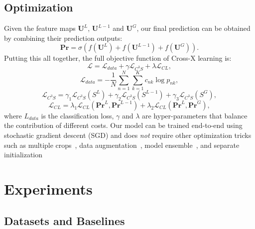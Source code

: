 \documentclass[10pt,twocolumn,letterpaper]{article}
\begin{document}
\subsection{Optimization}
\label{sec:fpe}
Given the feature maps $\mathbf{U}^L$, $\mathbf{U}^{L-1}$ and $\mathbf{U}^G$, our final prediction can be obtained by combining their prediction outputs:
\begin{equation}
\label{eq:softmax}
\mathbf{Pr} = \sigma\left ( f(\mathbf{U}^L) + f(\mathbf{U}^{L-1}) + f(\mathbf{U}^G)\right ).
\end{equation}
Putting this all together, the full objective function of Cross-X learning is:
\begin{equation}
\label{eq:obj}
\mathcal{L} = \mathcal{L}_{data} + \gamma \mathcal{L}_{C^3S} + \lambda \mathcal{L}_{CL},
\end{equation}
\begin{equation}
\label{eq:datafit}
\mathcal{L}_{data}=-\frac{1}{N}\sum_{n=1}^N\sum_{k=1}^K c_{nk} \log p_{nk},
\end{equation}
\begin{equation}
\label{eq:c3s_loss}
\mathcal{L}_{C^3S}=\gamma_1\mathcal{L}_{C^3S}(S^L) + \gamma_{2}\mathcal{L}_{C^3S}(S^{L-1}) + \gamma_3\mathcal{L}_{C^3S}(S^G),
\end{equation}
\begin{equation}
\label{eq:kl_loss}
\mathcal{L}_{CL}=\lambda_{1}\mathcal{L}_{CL}(\mathbf{Pr}^L, \mathbf{Pr}^{L-1}) + \lambda_2\mathcal{L}_{CL}(\mathbf{Pr}^L, \mathbf{Pr}^G),
\end{equation}
where $L_{data}$ is the classification loss, $\gamma$ and $\lambda$ are hyper-parameters that balance the contribution of different costs.
Our model can be trained end-to-end using stochastic gradient descent (SGD) and does \textit{not} require other optimization tricks such as multiple crops~\cite{ntscnn@eccv}, data augmentation~\cite{kp@cvpr}, model ensemble~\cite{macnn@mei}, and separate initialization~\cite{dfbnet18larry} 








\section{Experiments}
\label{sec:exp}

\subsection{Datasets and Baselines}
\label{sec:datasets}
\end{document}
